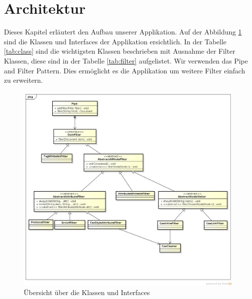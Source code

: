 \section{Architektur}

Dieses Kapitel erläutert den Aufbau unserer Applikation.
Auf der Abbildung \ref{fig:overview} sind die Klassen und Interfaces der Applikation ersichtlich. In der Tabelle \ref{tab:class} sind
die wichtigsten Klassen beschrieben mit Ausnahme der Filter Klassen, diese sind in der Tabelle \ref{tab:filter} aufgelistet. Wir verwenden das Pipe and Filter Pattern. Dies ermöglicht es die Applikation um weitere Filter einfach zu erweitern. 

\begin{figure}[ht]
	\begin{center}
		\includegraphics[width=1.0\textwidth]{./content/Class_Overview.png}
	\end{center}
	\caption{Übersicht über die Klassen und Interfaces}
	\label{fig:overview}
\end{figure}

